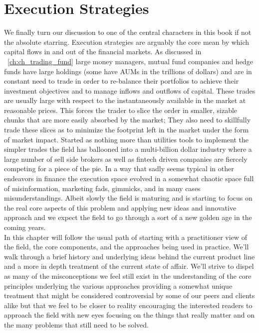 \chapter{Execution Strategies\label{chap:ch_exec_models}}

We finally turn our discussion to one of the central characters in this book if not the absolute starring. Execution strategies are arguably the core mean by which capital flows in and out of the financial markets.  As discussed in ~\ref{ch:ch_trading_fund} large money managers, mutual fund companies and hedge funds have large holdings (some have AUMs in the trillions of dollars) and are in constant need to trade in order to re-balance their portfolios to achieve their investment objectives and to manage inflows and  outflows of capital. These trades are usually large with respect to the instantaneously available  in the market at reasonable prices. This forces the trader to slice the order in smaller, sizable chunks that are more easily absorbed by the market; They also need to skillfully trade these slices as to minimize the footprint left in the market under the form of market impact. Started as nothing more than utilities tools to implement the simpler trades the field has ballooned into a multi-billion dollar industry where a large number of sell side brokers as well as fintech driven companies are fiercely competing for a piece of the pie. In a way that sadly seems typical in other endeavors in finance the execution space evolved in a somewhat chaotic space full of misinformation, marketing fads, gimmicks, and in many cases misunderstandings. Albeit slowly the field is maturing and is starting to focus on the real core aspects of this problem and applying new ideas and innovative approach and we expect the field to go through a sort of a new golden age in the coming years.\\

In this chapter will follow the usual path of starting with a practitioner view of the field, the core components, and the approaches being used in practice. We'll walk through a brief history and underlying ideas behind the current product line and a more in depth treatment of the current state of affair. We'll strive to dispel as many of the misconceptions we feel still exist in the understanding of the core principles underlying the various approaches providing a somewhat unique treatment that might be considered controversial by some of our peers and clients alike but that we feel to be closer to reality encouraging the interested readers to approach the field with new eyes focusing on the things that really matter and on the many problems that still need to be solved.

